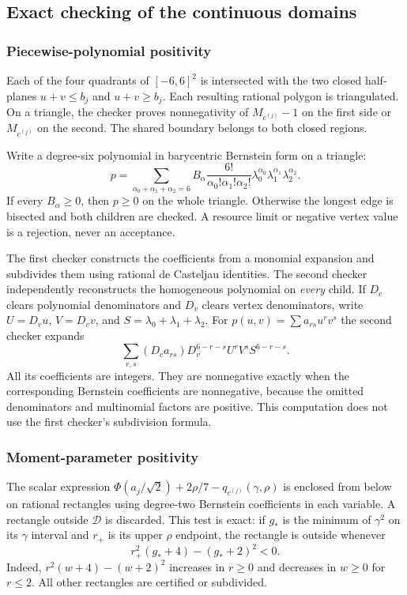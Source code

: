\documentclass[11pt,a4paper]{article}
\numberwithin{equation}{section}
\theoremstyle{definition}
\theoremstyle{remark}
\begin{document}
\subsection{Exact checking of the continuous domains}
\subsubsection{Piecewise-polynomial positivity}
Each of the four quadrants of $[-6,6]^2$ is intersected with the two closed
half-planes $u+v\le b_j$ and $u+v\ge b_j$. Each resulting rational polygon is
triangulated. On a triangle, the checker proves nonnegativity of
$M_{c^{(j)}}-1$ on the first side or $M_{c^{(j)}}$ on the second.
The shared boundary belongs to both closed regions.

Write a degree-six polynomial in barycentric Bernstein form on a triangle:
\[
 p=\sum_{\alpha_0+\alpha_1+\alpha_2=6}
 B_\alpha\frac{6!}{\alpha_0!\alpha_1!\alpha_2!}
 \lambda_0^{\alpha_0}\lambda_1^{\alpha_1}\lambda_2^{\alpha_2}.
\]
If every $B_\alpha\ge0$, then $p\ge0$ on the whole triangle. Otherwise the
longest edge is bisected and both children are checked. A resource limit or
negative vertex value is a rejection, never an acceptance.

The first checker constructs the coefficients from a monomial expansion and
subdivides them using rational de Casteljau identities. The second checker
independently reconstructs the homogeneous polynomial on \emph{every} child.
If $D_c$ clears polynomial denominators and $D_v$ clears vertex denominators,
write $U=D_vu$, $V=D_vv$, and $S=\lambda_0+\lambda_1+\lambda_2$.
For $p(u,v)=\sum a_{rs}u^rv^s$ the second checker expands
\[
 \sum_{r,s}(D_ca_{rs})D_v^{6-r-s}U^rV^sS^{6-r-s}.
\]
All its coefficients are integers. They are nonnegative exactly when the
corresponding Bernstein coefficients are nonnegative, because the omitted
denominators and multinomial factors are positive. This computation does not
use the first checker's subdivision formula.

\subsubsection{Moment-parameter positivity}
The scalar expression
$\Phi(a_j/\sqrt2)+2\rho/7-q_{c^{(j)}}(\gamma,\rho)$ is enclosed from below
on rational rectangles using degree-two Bernstein coefficients in each
variable. A rectangle outside $\mathcal D$ is discarded. This test is exact:
if $g_*$ is the minimum of $\gamma^2$ on its $\gamma$ interval and $r_+$ is
its upper $\rho$ endpoint, the rectangle is outside whenever
\[
 r_+^2(g_*+4)-(g_*+2)^2<0.
\]
Indeed, $r^2(w+4)-(w+2)^2$ increases in $r\ge0$ and decreases in
$w\ge0$ for $r\le2$. All other rectangles are certified or subdivided.
\end{document}
